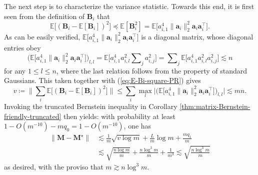 The next step is to characterize the variance statistic. Towards
this end, it is first seen from the definition of $\bm{B}_i$ that
%
\begin{equation}
\mathbb{E}\big[\left(\bm{B}_{i}-\mathbb{E}[\bm{B}_{i}]\right)^{2}\big]\preceq\mathbb{E}[\bm{B}_{i}^{2}]
=\mathbb{E}\big[a_{i,1}^{4}\big\|\bm{a}_{i}\big\|_{2}^{2}\bm{a}_{i}\bm{a}_{i}^{\top}\big].\label{eq:E-Bi-square-PR}
\end{equation}
%
As can be easily verified, $\mathbb{E}\big[a_{i,1}^{4}\big\|\bm{a}_{i}\big\|_{2}^{2}\bm{a}_{i}\bm{a}_{i}^{\top}\big]$
is a diagonal matrix, whose diagonal entries obey
\[
\Big(\mathbb{E}\big[a_{i,1}^{4}\big\|\bm{a}_{i}\big\|_{2}^{2}\bm{a}_{i}\bm{a}_{i}^{\top}\big]\Big)_{l,l}=\mathbb{E}\big[a_{i,1}^{4}a_{i,l}^{2}\sum\nolimits _{j}a_{i,j}^{2}\big]=\sum\nolimits _{j}\mathbb{E}\big[a_{i,1}^{4}a_{i,l}^{2}a_{i,j}^{2}\big]\lesssim n
\]
for any $1\leq l\leq n$, where the last relation follows from the
property of standard Gaussians. This taken together with
(\ref{eq:E-Bi-square-PR}) gives
%
\[
v\coloneqq\Big\|\sum_{i}\mathbb{E}\big[\left(\bm{B}_{i}-\mathbb{E}[\bm{B}_{i}]\right)^{2}\big]  \Big \|\leq \sum_{i} \max _{l}\Big|\Big(\mathbb{E}\big[a_{i,1}^{4}\big\|\bm{a}_{i}\big\|_{2}^{2}\bm{a}_{i}\bm{a}_{i}^{\top}\big]\Big)_{l,l}\Big|\lesssim mn.
\]
%
%
Invoking the truncated Bernstein inequality
in Corollary \ref{thm:matrix-Bernstein-friendly-truncated} then yields: with probability at least $1-O(m^{-10})-mq_0=1-O(m^{-10})$, one has
\begin{align*}
\big\|\bm{M}-\bm{M}^{\star}\big\| & \lesssim\frac{1}{m}\sqrt{v\log m}+\frac{L}{m}\log m + \frac{mq_1}{m} \\
 & \lesssim\sqrt{\frac{n\log m}{m}}+\frac{n\log^{3}m}{m} +\frac{1}{m^3} \lesssim\sqrt{\frac{n\log^{3}m}{m}}
\end{align*}
%
as desired, with the proviso that $m\gtrsim n\log^{3}m$.



